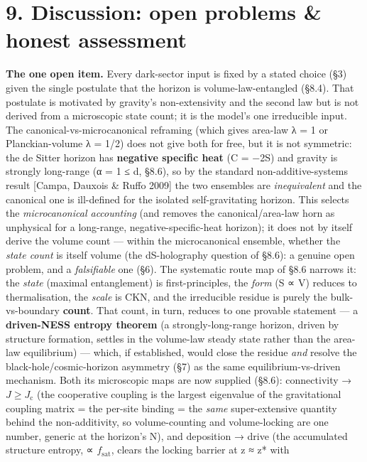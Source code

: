 \documentclass[
  10pt,
]{article}
\begin{document}
\section{9. Discussion: open problems \& honest
assessment}\label{discussion-open-problems-honest-assessment}

\textbf{The one open item.} Every dark-sector input is fixed by a stated
choice (§3) given the single postulate that the horizon is
volume-law-entangled (§8.4). That postulate is motivated by gravity's
non-extensivity and the second law but is not derived from a microscopic
state count; it is the model's one irreducible input. The
canonical-vs-microcanonical reframing (which gives area-law λ = 1 or
Planckian-volume λ = 1/2) does not give both for free, but it is not
symmetric: the de Sitter horizon has \textbf{negative specific heat} (C
= −2S) and gravity is strongly long-range (α = 1 ≤ d, §8.6), so by the
standard non-additive-systems result {[}Campa, Dauxois \& Ruffo 2009{]}
the two ensembles are \emph{inequivalent} and the canonical one is
ill-defined for the isolated self-gravitating horizon. This selects the
\emph{microcanonical accounting} (and removes the canonical/area-law
horn as unphysical for a long-range, negative-specific-heat horizon); it
does not by itself derive the volume count --- within the microcanonical
ensemble, whether the \emph{state count} is itself volume (the
dS-holography question of §8.6): a genuine open problem, and a
\emph{falsifiable} one (§6). The systematic route map of §8.6 narrows
it: the \emph{state} (maximal entanglement) is first-principles, the
\emph{form} (S ∝ V) reduces to thermalisation, the \emph{scale} is CKN,
and the irreducible residue is purely the bulk-vs-boundary
\textbf{count}. That count, in turn, reduces to one provable statement
--- a \textbf{driven-NESS entropy theorem} (a strongly-long-range
horizon, driven by structure formation, settles in the volume-law steady
state rather than the area-law equilibrium) --- which, if established,
would close the residue \emph{and} resolve the black-hole/cosmic-horizon
asymmetry (§7) as the same equilibrium-vs-driven mechanism. Both its
microscopic maps are now supplied (§8.6): connectivity →
\(J \geq  J_{\mathrm{c}}\) (the cooperative coupling is the largest
eigenvalue of the gravitational coupling matrix = the per-site binding =
the \emph{same} super-extensive quantity behind the non-additivity, so
volume-counting and volume-locking are one number, generic at the
horizon's N), and deposition → drive (the accumulated structure entropy,
∝ \(f_{\mathrm{sat}}\), clears the locking barrier at z ≈ z* with
\end{document}
